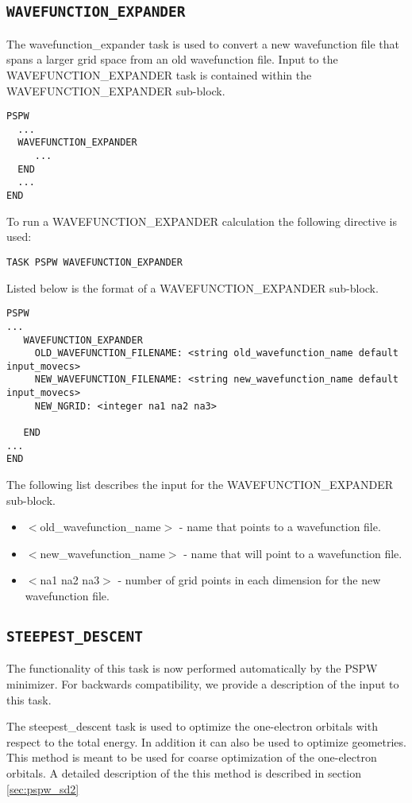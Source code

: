 \subsection{\tt WAVEFUNCTION\_EXPANDER}
\label{sec:pspw_wavefunction_expander}
The wavefunction\_expander task is used to convert a new wavefunction
file that spans a larger grid space from an old wavefunction file.
Input to the WAVEFUNCTION\_EXPANDER task is contained
within the WAVEFUNCTION\_EXPANDER sub-block.
\begin{verbatim}
PSPW
  ...
  WAVEFUNCTION_EXPANDER
     ...
  END
  ...
END
\end{verbatim}
To run a WAVEFUNCTION\_EXPANDER calculation the following directive 
is used:
\begin{verbatim}
TASK PSPW WAVEFUNCTION_EXPANDER
\end{verbatim}
Listed below is the format of a WAVEFUNCTION\_EXPANDER sub-block.
\begin{verbatim}
PSPW
... 
   WAVEFUNCTION_EXPANDER   
     OLD_WAVEFUNCTION_FILENAME: <string old_wavefunction_name default input_movecs>
     NEW_WAVEFUNCTION_FILENAME: <string new_wavefunction_name default input_movecs>
     NEW_NGRID: <integer na1 na2 na3>
    
   END
...
END
\end{verbatim}
The following list describes the input for the WAVEFUNCTION\_EXPANDER
sub-block.
\begin{itemize}
        \item $<$old\_wavefunction\_name$>$ - name that points
              to a wavefunction file.
        \item $<$new\_wavefunction\_name$>$ - name that will 
              point to a wavefunction file.
        \item $<$na1 na2 na3$>$ - number of grid points in each dimension
              for the new wavefunction file. 
\end{itemize}

\subsection{\tt STEEPEST\_DESCENT} 
\label{sec:pspw_steepest_descent}
The functionality of this task is now performed automatically by the PSPW minimizer. 
For backwards compatibility, we provide a description of the input to this task.

The steepest\_descent task is used to optimize the one-electron orbitals
with respect to the total energy.  In addition it can also be used to optimize
geometries.   This method is meant to be used for coarse optimization of
the one-electron orbitals.  A detailed description of the this method
is described in section \ref{sec:pspw_sd2}

